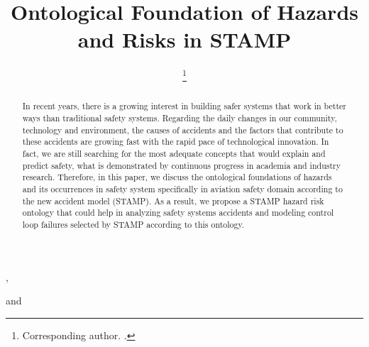 \documentclass[sw]{iosart2x}
\begin{document}
\def\theequation{A\arabic{equation}}
\begin{frontmatter}
\title{Ontological Foundation of Hazards and Risks in STAMP}
\author[A]{ %
\thanks{Corresponding author. .}},
\author[A]{ }
and
\author[B]{ }
\address[A]{Department of Cybernetics, , }
\address[B]{Department of Air Transport, , }

\begin{abstract}
In recent years, there is a growing interest in building safer systems that work in better ways than traditional safety systems. Regarding the daily changes in our community, technology and environment, the causes of accidents and the factors that contribute to these accidents are growing fast with the rapid pace of technological innovation. In fact, we are still searching for the most adequate concepts that would explain and predict safety, what is demonstrated by continuous progress in academia and industry research. Therefore, in this paper, we discuss the ontological foundations of hazards and its occurrences in safety system specifically in aviation safety domain according to the new accident model (STAMP). As a result, we propose a STAMP hazard risk ontology that could help in analyzing safety systems accidents and modeling control loop failures selected by STAMP according to this ontology. 
\end{abstract}

\begin{keyword}
\end{keyword}

\end{frontmatter}
\end{document}
